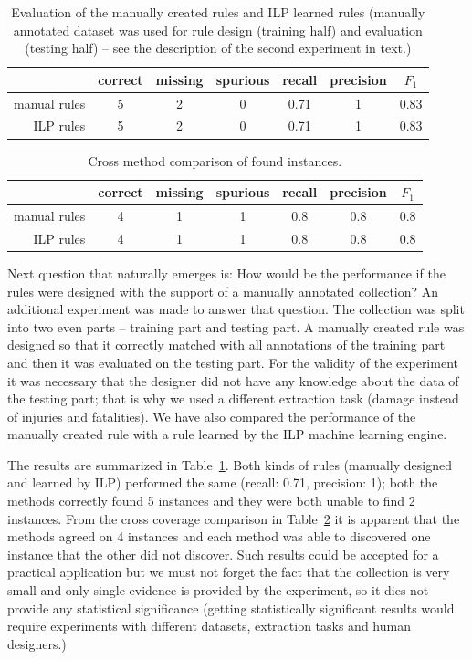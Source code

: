 \begin{table}
	\centering
	\begin{tabular}{|r|c|c|c|c|c|c|}
		\hline
		 & correct & missing & spurious & recall & precision & $F_1$\\
		\hline
		manual rules & 5 & 2 & 0 & 0.71 & 1 & 0.83\\
		\hline
		ILP rules & 5 & 2 & 0 & 0.71 & 1 & 0.83\\
		\hline
	\end{tabular}
	\caption{Evaluation of the manually created rules and ILP learned rules (manually annotated dataset was used for rule design (training half) and evaluation (testing half) -- see the description of the second experiment in text.)}
	\label{tab:manual_damage_manual_eval}
\end{table}

\begin{table}
	\centering
	\begin{tabular}{|r|c|c|c|c|c|c|}
		\hline
		 & correct & missing & spurious & recall & precision & $F_1$\\
		\hline
		manual rules & 4 & 1 & 1 & 0.8 & 0.8 & 0.8\\
		\hline
		ILP rules & 4 & 1 & 1 & 0.8 & 0.8 & 0.8\\
		\hline
	\end{tabular}
	\caption{Cross method comparison of found instances.}
	\label{tab:manual_damage_cross_method}
\end{table}




Next question that naturally emerges is: How would be the performance if the rules were designed with the support of a manually annotated collection? An additional experiment was made to answer that question. The collection was split into two even parts -- training part and testing part. A manually created rule was designed so that it correctly matched with all annotations of the training part and then it was evaluated on the testing part. For the validity of the experiment it was necessary that the designer did not have any knowledge about the data of the testing part; that is why we used a different extraction task (damage instead of injuries and fatalities). We have also compared the performance of the manually created rule with a rule learned by the ILP machine learning engine.

The results are summarized in Table~\ref{tab:manual_damage_manual_eval}. Both kinds of rules (manually designed and learned by ILP) performed the same (recall: 0.71, precision: 1); both the methods correctly found 5 instances and they were both unable to find 2 instances. From the cross coverage comparison in 
Table~\ref{tab:manual_damage_cross_method} it is apparent that the methods agreed on 4 instances and each method was able to discovered one instance that the other did not discover. Such results could be accepted for a practical application but we must not forget the fact that the collection is very small and only single evidence is provided by the experiment, so it dies not provide any statistical significance (getting statistically significant results would require experiments with different datasets, extraction tasks and human designers.) 

